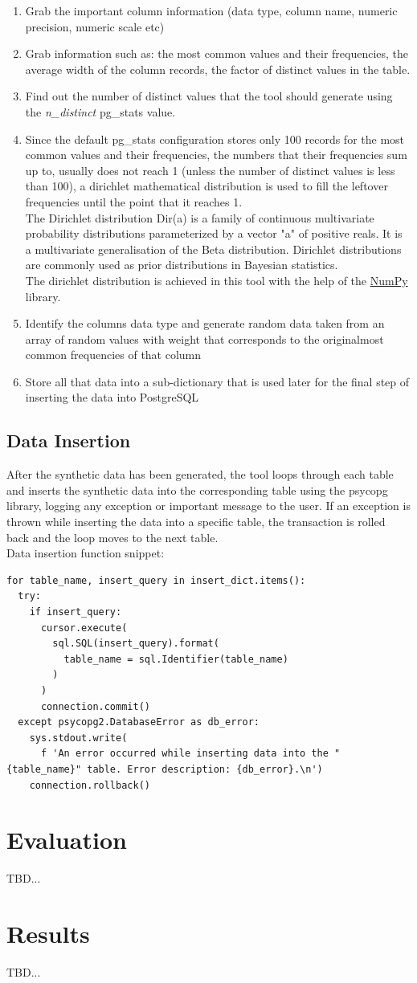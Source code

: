 \begin{enumerate}
\item{Grab the important column information (data type, column name, numeric precision, numeric scale etc)}
\item{Grab information such as: the most common values and their frequencies, the average width of the column records, the factor of distinct values in the table.}
\item{Find out the number of distinct values that the tool should generate using the \textit{n\_distinct} pg\_stats value.}
\item{Since the default pg\_stats configuration stores only 100 records for the most common values and their frequencies, the numbers that their frequencies sum up to, usually does not reach 1 (unless the number of distinct values is less than 100), a dirichlet mathematical distribution is used to fill the leftover frequencies until the point that it reaches 1.\\
The Dirichlet distribution Dir(a) is a family of continuous multivariate probability distributions parameterized by a vector "a" of positive reals. It is a multivariate generalisation of the Beta distribution. Dirichlet distributions are commonly used as prior distributions in Bayesian statistics. \cite{WhatIsDirichletDistribution} \\
The dirichlet distribution is achieved in this tool with the help of the \href{https://numpy.org/}{NumPy} library.}
\item{Identify the columns data type and generate random data taken from an array of random values with weight that corresponds to the originalmost common frequencies of that column}
\item{Store all that data into a sub-dictionary that is used later for the final step of inserting the data into PostgreSQL}
\end{enumerate}
\subsection{Data Insertion}
After the synthetic data has been generated, the tool loops through each table and inserts the synthetic data into the corresponding table using the psycopg library, logging any exception or important message to the user. If an exception is thrown while inserting the data into a specific table, the transaction is rolled back and the loop moves to the next table.\\
\newline
Data insertion function snippet:
\begin{verbatim}
for table_name, insert_query in insert_dict.items():
  try:
    if insert_query:
      cursor.execute(
        sql.SQL(insert_query).format(
          table_name = sql.Identifier(table_name)
        )
      ) 
      connection.commit()
  except psycopg2.DatabaseError as db_error:
    sys.stdout.write(
      f 'An error occurred while inserting data into the "{table_name}" table. Error description: {db_error}.\n')
    connection.rollback()
\end{verbatim}
\section{Evaluation}
TBD...
\section{Results}
TBD...